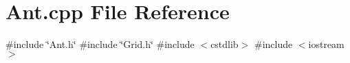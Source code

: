 \section{Ant.\+cpp File Reference}
\label{Ant_8cpp}
{\ttfamily \#include \char`\"{}Ant.\+h\char`\"{}}\newline
{\ttfamily \#include \char`\"{}Grid.\+h\char`\"{}}\newline
{\ttfamily \#include $<$cstdlib$>$}\newline
{\ttfamily \#include $<$iostream$>$}\newline
